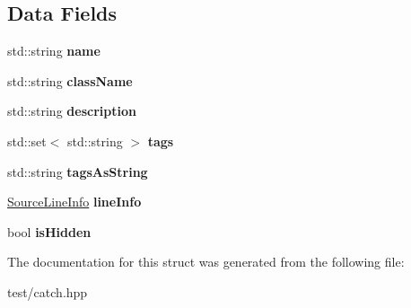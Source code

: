 \subsection*{Data Fields}
\begin{DoxyCompactItemize}
\item 
std\+::string {\bfseries name}\hypertarget{structCatch_1_1TestCaseInfo_a463794e2f5cfead307c93efd134ade36}{}\label{structCatch_1_1TestCaseInfo_a463794e2f5cfead307c93efd134ade36}

\item 
std\+::string {\bfseries class\+Name}\hypertarget{structCatch_1_1TestCaseInfo_a1a5e0825132a38d091defdebbf2f8ce9}{}\label{structCatch_1_1TestCaseInfo_a1a5e0825132a38d091defdebbf2f8ce9}

\item 
std\+::string {\bfseries description}\hypertarget{structCatch_1_1TestCaseInfo_a37fe2db9425bc45f6a33893eac31198e}{}\label{structCatch_1_1TestCaseInfo_a37fe2db9425bc45f6a33893eac31198e}

\item 
std\+::set$<$ std\+::string $>$ {\bfseries tags}\hypertarget{structCatch_1_1TestCaseInfo_a045f62e7719a8760a5b456f7fd2dc97c}{}\label{structCatch_1_1TestCaseInfo_a045f62e7719a8760a5b456f7fd2dc97c}

\item 
std\+::string {\bfseries tags\+As\+String}\hypertarget{structCatch_1_1TestCaseInfo_ac65c2d36fd36f71e9bf782b2ea245c64}{}\label{structCatch_1_1TestCaseInfo_ac65c2d36fd36f71e9bf782b2ea245c64}

\item 
\hyperlink{structCatch_1_1SourceLineInfo}{Source\+Line\+Info} {\bfseries line\+Info}\hypertarget{structCatch_1_1TestCaseInfo_aa9407b7f442655b51a2aad24b3fa2fd3}{}\label{structCatch_1_1TestCaseInfo_aa9407b7f442655b51a2aad24b3fa2fd3}

\item 
bool {\bfseries is\+Hidden}\hypertarget{structCatch_1_1TestCaseInfo_a8c4c85cb2e28897721c9f5fe3950bc2f}{}\label{structCatch_1_1TestCaseInfo_a8c4c85cb2e28897721c9f5fe3950bc2f}

\end{DoxyCompactItemize}


The documentation for this struct was generated from the following file\+:\begin{DoxyCompactItemize}
\item 
test/catch.\+hpp\end{DoxyCompactItemize}
